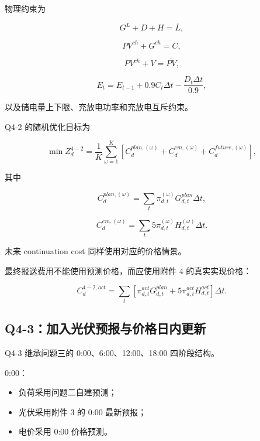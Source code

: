 物理约束为

\begin{equation}
G^L+D+H=\overline L,
\end{equation}

\begin{equation}
PV^{ch}+G^{ch}=C,
\end{equation}

\begin{equation}
PV^{ch}+V=\overline{PV},
\end{equation}

\begin{equation}
E_t
=
E_{t-1}
+
0.9C_t\Delta t
-
\frac{D_t\Delta t}{0.9},
\end{equation}

以及储电量上下限、充放电功率和充放电互斥约束。

Q4-2 的随机优化目标为

\begin{equation}
\min Z_d^{4-2}
=
\frac1K
\sum_{\omega=1}^{K}
\left[
C_d^{plan,(\omega)}
+
C_d^{em,(\omega)}
+
C_d^{future,(\omega)}
\right],
\end{equation}

其中

\begin{equation}
C_d^{plan,(\omega)}
=
\sum_t
\pi_{d,t}^{(\omega)}
G_{d,t}^{plan}
\Delta t,
\end{equation}

\begin{equation}
C_d^{em,(\omega)}
=
\sum_t
5\pi_{d,t}^{(\omega)}
H_{d,t}^{(\omega)}
\Delta t.
\end{equation}

未来 continuation cost 同样使用对应的价格情景。

最终报送费用不能使用预测价格，而应使用附件 4 的真实实现价格：

\begin{equation}
C_d^{4-2,act}
=
\sum_t
\left[
\pi_{d,t}^{act}G_{d,t}^{plan}
+
5\pi_{d,t}^{act}H_{d,t}^{act}
\right]\Delta t.
\end{equation}

\subsection{Q4-3：加入光伏预报与价格日内更新}

Q4-3 继承问题三的 0:00、6:00、12:00、18:00 四阶段结构。

0:00：

\begin{itemize}
\item 负荷采用问题二自建预测；
\item 光伏采用附件 3 的 0:00 最新预报；
\item 电价采用 0:00 价格预测。
\end{itemize}

